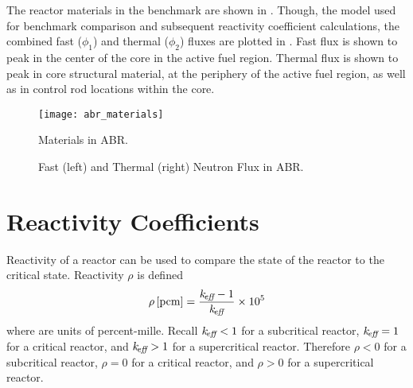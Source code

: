   The reactor materials in the benchmark are shown in . 
  Though, the model used for benchmark comparison and subsequent reactivity
  coefficient calculations, the combined fast ($\phi_1$) and thermal ($\phi_2$)
  fluxes are plotted in . Fast flux is shown to peak in
  the center of the core in the active fuel region. Thermal flux is shown to
  peak in core structural material, at the periphery of the active fuel region,
  as well as in control rod locations within the core.

  \begin{figure}
    \centering
    \texttt{[image: abr\_materials]}
    \caption{Materials in ABR.}
    \label{fig:abr_materials}
  \end{figure}

  \begin{figure}
    \centering
    \hspace{0.2in}
    \caption{Fast (left) and Thermal (right) Neutron Flux in ABR.}
    \label{fig:abr_fluxes}
  \end{figure}

\section{Reactivity Coefficients}
\label{sec:reactivity_coefficients}
  Reactivity of a reactor can be used to compare the state of the reactor to the
  critical state. Reactivity $\rho$ is defined
  \begin{equation}
    \label{eq:reactivity}
    \rho \left[\text{{pcm}}\right] = \frac{k_{\!\mbox{\scriptsize \em eff}}-1}{k_{\!\mbox{\scriptsize \em eff}}} \times 10^5
  \end{equation}
  where  are units of percent-mille.
  Recall $k_{\!\mbox{\scriptsize \em eff}} < 1$ for a subcritical reactor, $k_{\!\mbox{\scriptsize \em eff}}=1$ for a critical
  reactor, and $k_{\!\mbox{\scriptsize \em eff}} > 1$ for a supercritical reactor. Therefore $\rho < 0$
  for a subcritical reactor, $\rho = 0$ for a critical reactor, and $\rho > 0$
  for a supercritical reactor. 

